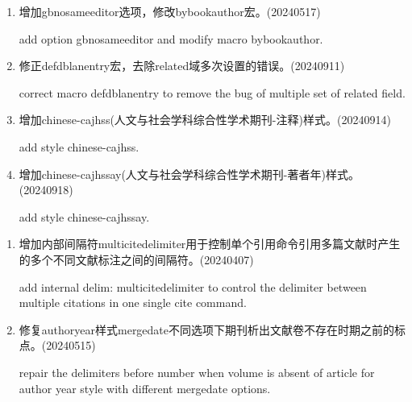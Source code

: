 \label{up:20241115}
\begin{enumerate}

\item 增加gbnosameeditor选项，修改bybookauthor宏。(20240517)

add option gbnosameeditor and modify macro bybookauthor.

\item 修正defdblanentry宏，去除related域多次设置的错误。(20240911)

correct macro defdblanentry to remove the bug of multiple set of related field.

\item 增加chinese-cajhss(人文与社会学科综合性学术期刊-注释)样式。(20240914)

add style chinese-cajhss.

\item 增加chinese-cajhssay(人文与社会学科综合性学术期刊-著者年)样式。(20240918)

add style chinese-cajhssay.

\end{enumerate}



\label{up:20240515}
\begin{enumerate}

\item 增加内部间隔符multicitedelimiter用于控制单个引用命令引用多篇文献时产生的多个不同文献标注之间的间隔符。(20240407)

add internal delim: multicitedelimiter to control the delimiter between multiple citations in one single cite command.


\item 修复authoryear样式mergedate不同选项下期刊析出文献卷不存在时期之前的标点。(20240515)

repair the delimiters before number when volume is absent of article for author year style with different  mergedate options.

\end{enumerate}

